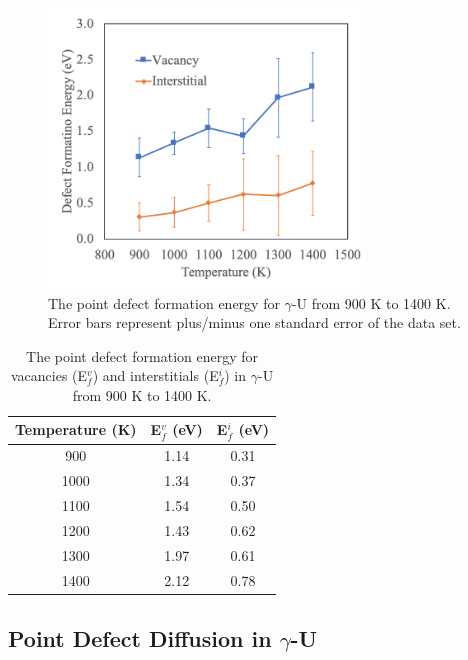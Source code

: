 \documentclass[review]{elsarticle}
\begin{document}
 \begin{figure}[h]
 \centering
 \includegraphics[width=0.75\textwidth]{eform.png} 
 \caption{The point defect formation energy for $\gamma$-U from 900 K to 1400 K. Error bars represent plus/minus one standard error of the data set. }
 \label{fig:eform}
\end{figure}

\begin{table}[h]
\caption{The point defect formation energy for vacancies (E$_{f}^{v}$) and interstitials (E$_{f}^{i}$) in $\gamma$-U from 900 K to 1400 K.} \label{tab:defs}
\begin{center}
\begin{tabular}{|c|c|c|}
	\hline
	Temperature (K) & E$_{f}^{v}$ (eV) & E$_{f}^{i}$ (eV) \\
	 \hline
  	   900 & 1.14 & 0.31 \\
	 1000 & 1.34 & 0.37 \\
	 1100 & 1.54 & 0.50 \\
	 1200 & 1.43 & 0.62 \\
	 1300 & 1.97 & 0.61 \\
	 1400 & 2.12 & 0.78 \\
	 \hline
\end{tabular}
\end{center}
\label{default}
\end{table}

\FloatBarrier

\subsection{Point Defect Diffusion in $\gamma$-U}
\end{document}
